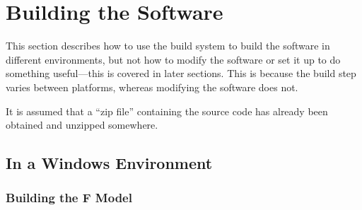 \section{Building the Software}
\label{dev:build}

This section describes how to use the build system to build the software in different environments, 
but not how to modify the software or set it up to do something useful---this is covered in later 
sections.  This is because the build step varies between platforms, whereas modifying the software 
does not.

It is assumed that a ``zip file'' containing the source code has already been obtained and unzipped 
somewhere.

\subsection{In a Windows Environment}

\subsubsection{Building the F Model}

